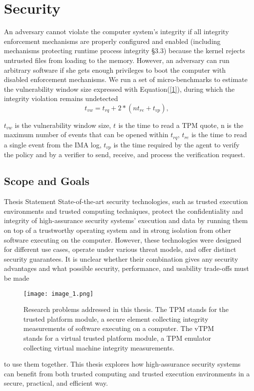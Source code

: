 \documentclass[acmtog]{acmart}
\begin{document}
\tableofcontents
\newpage
\section{Security }
\raggedright An adversary cannot violate the computer system’s integrity if all integrity enforcement mechanisms are properly configured and enabled (including mechanisms protecting runtime process integrity §3.3) because the kernel rejects untrusted files from loading to the memory. However, an adversary can run arbitrary software if she gets enough privileges to boot the computer with disabled enforcement mechanisms. We run a set of micro-benchmarks to estimate the vulnerability window size expressed with Equation(\ref{1}), during which the integrity violation remains undetected
\begin{equation}
t_{vw}= t_{rq} + 2 * (nt_{re} + t_{vp}),\label{1}
\end{equation}
\raggedright $t_{vw}$  is the vulnerability window size, $t_{}$ is the time to read a TPM quote, n is the maximum number of events that can be opened within $t_{rq}$, $t_{re}$ is the time to read a single event from the IMA log, $t_{vp}$ is the time required by the agent to verify the policy and by a verifier to send, receive, and process the verification request.
\newline
\subsection{Scope and Goals}  

\raggedright Thesis Statement State-of-the-art security technologies, such as trusted execution environments and trusted computing techniques, protect the confidentiality and integrity of high-assurance security systems’ execution and data by running them on top of a trustworthy operating system and in strong isolation from other software executing on the computer. However, these technologies were designed for different use cases, operate under various threat models, and offer distinct security guarantees. It is unclear whether their combination gives any security advantages and what possible security, performance, and usability trade-offs must be made
\newline
\begin{figure}[H]
    \centering
    \texttt{[image: image\_1.png]}
    \caption{Research problems addressed in this thesis. The TPM stands for the trusted platform module, a secure element collecting integrity measurements of software executing on a computer. The vTPM stands for a virtual trusted platform module, a TPM emulator collecting virtual machine integrity measurements.}
    \label{2}
\end{figure}
\raggedright to use them together. This thesis explores how high-assurance security systems can benefit from both trusted computing and trusted execution environments in a secure, practical, and efficient way.
\noindent
\end{document}
